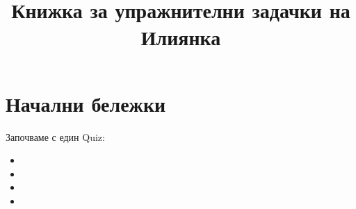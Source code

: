 \documentclass{article}
\date{}
\title{Книжка за упражнителни задачки на Илиянка}
\theoremstyle{plain}
\begin{document}
	
	
	\maketitle
	\tableofcontents
	
	\section{Начални бележки}
	Започваме с един Quiz:
	\begin{itemize}
		\item 
		\item 
		\item 
		\item 
		
		
	\end{itemize}
	
	
	
\end{document}
